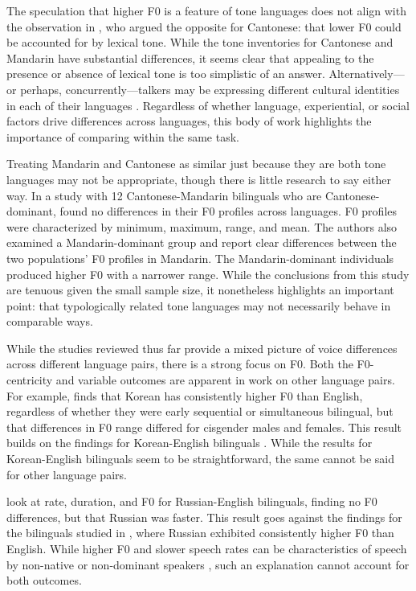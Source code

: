 The speculation that higher F0 is a feature of tone languages does not align with the observation in \citet{ng_2012_ltas}, who argued the opposite for Cantonese: that lower F0 could be accounted for by lexical tone. While the tone inventories for Cantonese and Mandarin have substantial differences, it seems clear that appealing to the presence or absence of lexical tone is too simplistic of an answer. Alternatively—or perhaps, concurrently—talkers may be expressing different cultural identities in each of their languages \citep[see][]{loveday_1981_pitch}. Regardless of whether language, experiential, or social factors drive differences across languages, this body of work highlights the importance of comparing within the same task.

Treating Mandarin and Cantonese as similar just because they are both tone languages may not be appropriate, though there is little research to say either way. In a study with 12 Cantonese-Mandarin bilinguals who are Cantonese-dominant, \citet{yang_2020_f0} found no differences in their F0 profiles across languages. F0 profiles were characterized by minimum, maximum, range, and mean. The authors also examined a Mandarin-dominant group and report clear differences between the two populations' F0 profiles in Mandarin. The Mandarin-dominant individuals produced higher F0 with a narrower range. While the conclusions from this study are tenuous given the small sample size, it nonetheless highlights an important point: that typologically related tone languages may not necessarily behave in comparable ways.

While the studies reviewed thus far provide a mixed picture of voice differences across different language pairs, there is a strong focus on F0. Both the F0-centricity and variable outcomes are apparent in work on other language pairs. For example, \citet{cheng_2020_f0} finds that Korean has consistently higher F0 than English, regardless of whether they were early sequential or simultaneous bilingual, but that differences in F0 range differed for cisgender males and females. This result builds on the findings for Korean-English bilinguals \citep{lee_2017_bilingual}. While the results for Korean-English bilinguals seem to be straightforward, the same cannot be said for other language pairs. 

\citet{ryabov_2016_self} look at rate, duration, and F0 for Russian-English bilinguals, finding no F0 differences, but that Russian was faster. This result goes against the findings for the bilinguals studied in \citet{altenberg_2006_f0}, where Russian exhibited consistently higher F0 than English. While higher F0 and slower speech rates can be characteristics of speech by non-native or non-dominant speakers \citep{jarvinen_2013_speaking}, such an explanation cannot account for both outcomes. 

